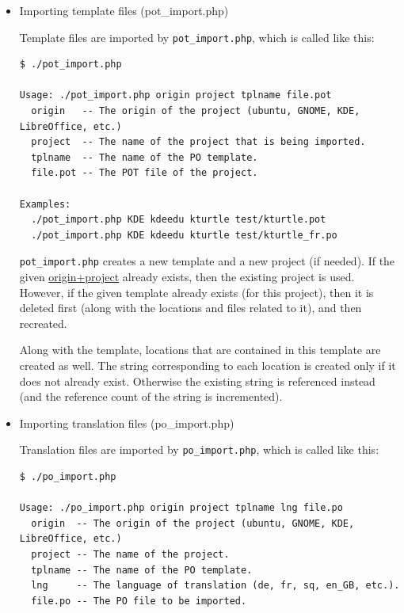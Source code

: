\documentclass[11pt]{article}
\begin{document}
\begin{itemize}

\item Importing template files (pot\_{}import.php)\\
\label{sec-8.4.2.1}


     Template files are imported by \texttt{pot\_import.php}, which is called
     like this:

\begin{verbatim}
$ ./pot_import.php

Usage: ./pot_import.php origin project tplname file.pot
  origin   -- The origin of the project (ubuntu, GNOME, KDE, LibreOffice, etc.)
  project  -- The name of the project that is being imported.
  tplname  -- The name of the PO template.
  file.pot -- The POT file of the project.

Examples:
  ./pot_import.php KDE kdeedu kturtle test/kturtle.pot
  ./pot_import.php KDE kdeedu kturtle test/kturtle_fr.po
\end{verbatim}



     \texttt{pot\_import.php} creates a new template and a new project (if
     needed).  If the given \underline{origin+project} already exists, then the
     existing project is used.  However, if the given template already
     exists (for this project), then it is deleted first (along with the
     locations and files related to it), and then recreated.
      
     Along with the template, locations that are contained in this
     template are created as well. The string corresponding to each
     location is created only if it does not already exist. Otherwise
     the existing string is referenced instead (and the reference count
     of the string is incremented).


\item Importing translation files (po\_{}import.php)\\
\label{sec-8.4.2.2}


     Translation files are imported by \texttt{po\_import.php}, which is called
     like this:

\begin{verbatim}
$ ./po_import.php

Usage: ./po_import.php origin project tplname lng file.po
  origin  -- The origin of the project (ubuntu, GNOME, KDE, LibreOffice, etc.)
  project -- The name of the project.
  tplname -- The name of the PO template.
  lng     -- The language of translation (de, fr, sq, en_GB, etc.).
  file.po -- The PO file to be imported.


\end{verbatim}
\end{itemize}
\end{document}
